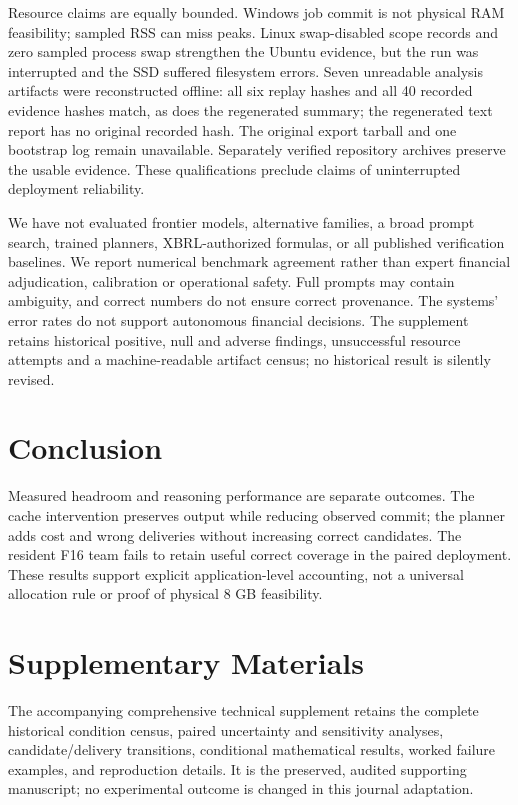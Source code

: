 \documentclass[computers,article,submit,moreauthors]{Definitions/mdpi}
\begin{document}
Resource claims are equally bounded. Windows job commit is not physical RAM feasibility; sampled RSS can miss peaks. Linux swap-disabled scope records and zero sampled process swap strengthen the Ubuntu evidence, but the run was interrupted and the SSD suffered filesystem errors. Seven unreadable analysis artifacts were reconstructed offline: all six replay hashes and all 40 recorded evidence hashes match, as does the regenerated summary; the regenerated text report has no original recorded hash. The original export tarball and one bootstrap log remain unavailable. Separately verified repository archives preserve the usable evidence. These qualifications preclude claims of uninterrupted deployment reliability.

We have not evaluated frontier models, alternative families, a broad prompt search, trained planners, XBRL-authorized formulas, or all published verification baselines. We report numerical benchmark agreement rather than expert financial adjudication, calibration or operational safety. Full prompts may contain ambiguity, and correct numbers do not ensure correct provenance. The systems' error rates do not support autonomous financial decisions. The supplement retains historical positive, null and adverse findings, unsuccessful resource attempts and a machine-readable artifact census; no historical result is silently revised.


\section{Conclusion}Measured headroom and reasoning performance are separate outcomes. The cache intervention preserves output while reducing observed commit; the planner adds cost and wrong deliveries without increasing correct candidates. The resident F16 team fails to retain useful correct coverage in the paired deployment. These results support explicit application-level accounting, not a universal allocation rule or proof of physical 8 GB feasibility.\section*{Supplementary Materials}
The accompanying comprehensive technical supplement retains the complete historical condition census, paired uncertainty and sensitivity analyses, candidate/delivery transitions, conditional mathematical results, worked failure examples, and reproduction details. It is the preserved, audited supporting manuscript; no experimental outcome is changed in this journal adaptation.
\end{document}
